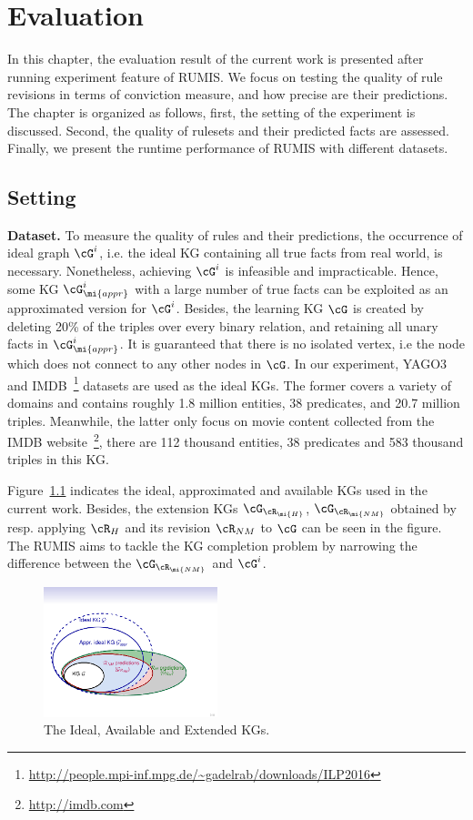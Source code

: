 \chapter{Evaluation}
\label{chap:eval}

In this chapter, the evaluation result of the current work is presented after running experiment feature of RUMIS. We focus on testing the quality of rule revisions in terms of conviction measure, and how precise are their predictions. The chapter is organized as follows, first, the setting of the experiment is discussed. Second, the quality of rulesets and their predicted facts are assessed. Finally, we present the runtime performance of RUMIS with different datasets.

\section{Setting}

\textbf{Dataset.} To measure the quality of rules and their predictions, the occurrence of ideal graph $\cG^i$, i.e. the ideal KG containing all true facts from real world, is necessary. Nonetheless, achieving $\cG^i$ is infeasible and impracticable. Hence, some KG $\cG^i_{\mi{appr}}$ with a large number of true facts can be exploited as an approximated version for $\cG^i$. Besides, the learning KG $\cG$ is created by deleting 20\% of the triples over every binary relation, and retaining all unary facts in $\cG^i_{\mi{appr}}$. It is guaranteed that there is no isolated vertex, i.e the node which does not connect to any other nodes in $\cG$. In our experiment, YAGO3~\cite{ref28} and IMDB~\footnote{\url{http://people.mpi-inf.mpg.de/~gadelrab/downloads/ILP2016}} datasets are used as the ideal KGs. The former covers a variety of domains and contains roughly 1.8 million entities, 38 predicates, and 20.7 million triples. Meanwhile, the latter only focus on movie content collected from the IMDB website~\footnote{\url{http://imdb.com}}, there are 112 thousand entities, 38 predicates and 583 thousand triples in this KG.

Figure~\ref{fig:venn} indicates the ideal, approximated and available KGs used in the current work. Besides, the extension KGs $\cG_{\cR_{\mi{H}}}$, $\cG_{\cR_{\mi{NM}}}$ obtained by resp. applying $\cR_H$ and its revision $\cR_{NM}$ to $\cG$ can be seen in the figure. The RUMIS aims to tackle the KG completion problem by narrowing the difference between the $\cG_{\cR_{\mi{NM}}}$ and $ \cG^i$.

\begin{figure}[ht]
\centering
\includegraphics[width=0.45\textwidth]{figures/big_pic_exp}
\caption{The Ideal, Available and Extended KGs.}
\label{fig:venn}
\end{figure}

